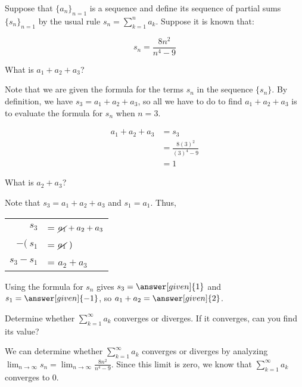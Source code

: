 \documentclass{ximera}
\begin{document}
\begin{example}
Suppose that $\{a_n\}_{n=1}$ is a sequence and define its sequence of partial sums $\{s_n\}_{n=1}$ by the usual rule $s_n = \sum_{k=1}^n a_k$.  Suppose it is known that:

\[
s_n = \frac{8n^2}{n^4-9}
\]

\begin{question}
What is $a_1+a_2+a_3$?  

\begin{explanation}
Note that we are given the formula for the terms $s_n$ in the sequence $\{s_n\}$.  By definition, we have $s_3 = a_1+a_2+a_3$, so all we have to do to find $a_1+a_2+a_3$ is to evaluate the formula for $s_n$ when $n=3$.

\begin{align*}
a_1+a_2+a_3 &= s_3 \\
& = \frac{8(3)^2}{(3)^4-9} \\
&= 1
\end{align*}
\end{explanation}
\end{question}

\begin{question}
What is $a_2+a_3$?

\begin{explanation}
Note that $s_3 = a_1+a_2+a_3$ and $s_1 = a_1$.  Thus, 

\begin{tabular}{rl}
$s_3$ &= $\cancel{a_1}+a_2+a_3$\\
$-(~ s_1$ &= $\cancel{a_1} ~)$\\
\hline
$s_3-s_1$ &= $a_2+a_3$\\
\end{tabular}

Using the formula for $s_n$ gives $s_3 = \answer[given]{1}$ and $s_1=\answer[given]{-1}$, so $a_1+a_2 =  \answer[given]{2}$.
\end{explanation}
\end{question}

\begin{question}
Determine whether $\sum_{k=1}^{\infty} a_k$ converges or diverges.  If it converges, can you find its value?

\begin{explanation}
We can determine whether $\sum_{k=1}^{\infty} a_k$ converges or diverges by analyzing $\lim_{n \to \infty} s_n = \lim_{n \to \infty} \frac{8n^2}{n^4-9}$.  Since this limit is zero, we know that $\sum_{k=1}^{\infty} a_k$ converges to $0$.
\end{explanation}
\end{question}


\end{example}
\end{document}
